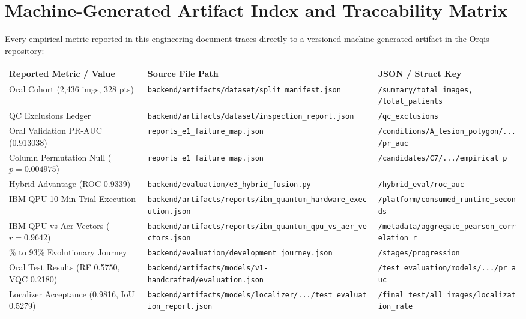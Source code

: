 \documentclass[11pt,a4paper]{report}
\newcommand{\artifact}[1]{\nolinkurl{#1}}
\newcommand{\keypath}[1]{\nolinkurl{#1}}
\begin{document}
\chapter{Machine-Generated Artifact Index and Traceability Matrix}

Every empirical metric reported in this engineering document traces directly to a versioned machine-generated artifact in the Orqis repository:

\begin{table}[H]
\centering
\scriptsize
\setlength{\tabcolsep}{2.5pt}
\begin{tabularx}{\textwidth}{>{\raggedright\arraybackslash}p{3.2cm} >{\raggedright\arraybackslash\sloppy}X >{\raggedright\arraybackslash\sloppy}p{4.2cm}}
\toprule
\textbf{Reported Metric / Value} & \textbf{Source File Path} & \textbf{JSON / Struct Key} \\
\midrule
Oral Cohort (2,436 imgs, 328 pts) & \artifact{backend/artifacts/dataset/split_manifest.json} & \keypath{/summary/total_images, /total_patients} \\
33 QC Exclusions Ledger & \artifact{backend/artifacts/dataset/inspection_report.json} & \keypath{/qc_exclusions} \\
Oral Validation PR-AUC (0.913038) & \artifact{reports_e1_failure_map.json} & \keypath{/conditions/A_lesion_polygon/.../pr_auc} \\
Column Permutation Null ($p=0.004975$) & \artifact{reports_e1_failure_map.json} & \keypath{/candidates/C7/.../empirical_p} \\
Hybrid Advantage (ROC 0.9339) & \artifact{backend/evaluation/e3_hybrid_fusion.py} & \keypath{/hybrid_eval/roc_auc} \\
IBM QPU 10-Min Trial Execution & \artifact{backend/artifacts/reports/ibm_quantum_hardware_execution.json} & \keypath{/platform/consumed_runtime_seconds} \\
IBM QPU vs Aer Vectors ($r=0.9642$) & \artifact{backend/artifacts/reports/ibm_quantum_qpu_vs_aer_vectors.json} & \keypath{/metadata/aggregate_pearson_correlation_r} \\
55\% to 93\% Evolutionary Journey & \artifact{backend/evaluation/development_journey.json} & \keypath{/stages/progression} \\
Oral Test Results (RF 0.5750, VQC 0.2180) & \artifact{backend/artifacts/models/v1-handcrafted/evaluation.json} & \keypath{/test_evaluation/models/.../pr_auc} \\
Localizer Acceptance (0.9816, IoU 0.5279) & \artifact{backend/artifacts/models/localizer/.../test_evaluation_report.json} & \keypath{/final_test/all_images/localization_rate} \\

\end{tabularx}
\end{table}
\end{document}
